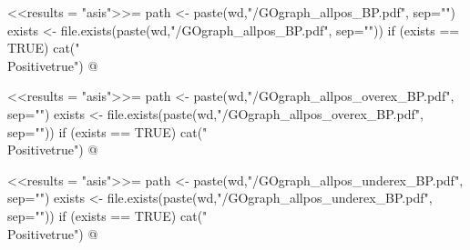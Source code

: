 \documentclass{article}
\begin{document}
\newif\ifPositive

<<results = "asis">>=
path <- paste(wd,"/GOgraph_allpos_BP.pdf", sep="")
exists <- file.exists(paste(wd,"/GOgraph_allpos_BP.pdf", sep=""))
if (exists == TRUE) {
  cat("\\Positivetrue")
}
@

\ifPositive
 \section{GO graphs of all possible DEGs - Biological Process (BP))}
 \subsection{General GOgraph of all possible DEGs}
 This is the GO graph provided by the topGO package (Image extracted from {\bf"GOgraph\_allpos\_BP.pdf"} file):
  \begin{center}
    \texttt{[image: \\Sexpr\{path]}}
  \end{center}
\fi


\newif\ifPositive

<<results = "asis">>=
path <- paste(wd,"/GOgraph_allpos_overex_BP.pdf", sep="")
exists <- file.exists(paste(wd,"/GOgraph_allpos_overex_BP.pdf", sep=""))
if (exists == TRUE) {
  cat("\\Positivetrue")
}
@

\ifPositive
 \subsection{GOgraph showing overexpressed functions from all possible DEGs}
  This is the GO graph concerning the overexpressed DEGs from the all possible DEGs (Image extracted from {\bf"GOgraph\_allpos\_overex\_BP.pdf"} file):
  \begin{center}
    \texttt{[image: \\Sexpr\{path]}}
  \end{center}
\fi


\newif\ifPositive

<<results = "asis">>=
path <- paste(wd,"/GOgraph_allpos_underex_BP.pdf", sep="")
exists <- file.exists(paste(wd,"/GOgraph_allpos_underex_BP.pdf", sep=""))
if (exists == TRUE) {
  cat("\\Positivetrue")
}
@

\ifPositive
 \subsection{GOgraph showing underexpressed functions from all possible DEGs}
  This is the GO graph concerning the underexpressed DEGs from the all possible DEGs (Image extracted from {\bf"GOgraph\_allpos\_underex\_BP.pdf"} file):
  \begin{center}
    \texttt{[image: \\Sexpr\{path]}}
  \end{center}
\fi
\end{document}
